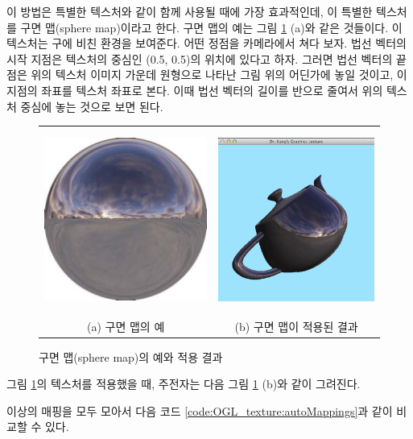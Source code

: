 이 방법은 특별한 텍스처와 같이 함께 사용될 때에 가장 효과적인데, 이 특별한 텍스처를 구면 맵(sphere map)이라고 한다.
구면 맵의 예는 그림 \ref{fig:OGL_texture:sphereMap} (a)와 같은 것들이다. 
이 텍스처는 구에 비친 환경을 보여준다. 어떤 정점을 카메라에서 쳐다 보자. 법선 벡터의 시작 지점은 텍스처의 중심인 (0.5, 0.5)의 위치에 있다고 하자. 그러면 법선 벡터의 끝 점은 위의 텍스처 이미지 가운데 원형으로 나타난 그림 위의 어딘가에 놓일 것이고, 이 지점의 좌표를 텍스처 좌표로 본다. 이때 법선 벡터의 길이를 반으로 줄여서 위의 텍스처 중심에 놓는 것으로 보면 된다.

\begin{figure}[h!]
  \centering
	\begin{tabular}{cc}\\ \hline
	\includegraphics[height=6cm]{OGL_texture/sphereMap.png} &
	\includegraphics[height=6cm]{OGL_texture/sphereMapped.png} \\
	(a) 구면 맵의 예 & (b) 구면 맵이 적용된 결과
	\end{tabular}
    \caption{구면 맵(sphere map)의 예와 적용 결과}
    \label{fig:OGL_texture:sphereMap}
\end{figure}

그림 \ref{fig:OGL_texture:sphereMap}의 텍스처를 적용했을 때, 주전자는 다음 그림 \ref{fig:OGL_texture:sphereMap} (b)와 같이 그려진다.

이상의 매핑을 모두 모아서 다음 코드 \ref{code:OGL_texture:autoMappings}과 같이 비교할 수 있다.

